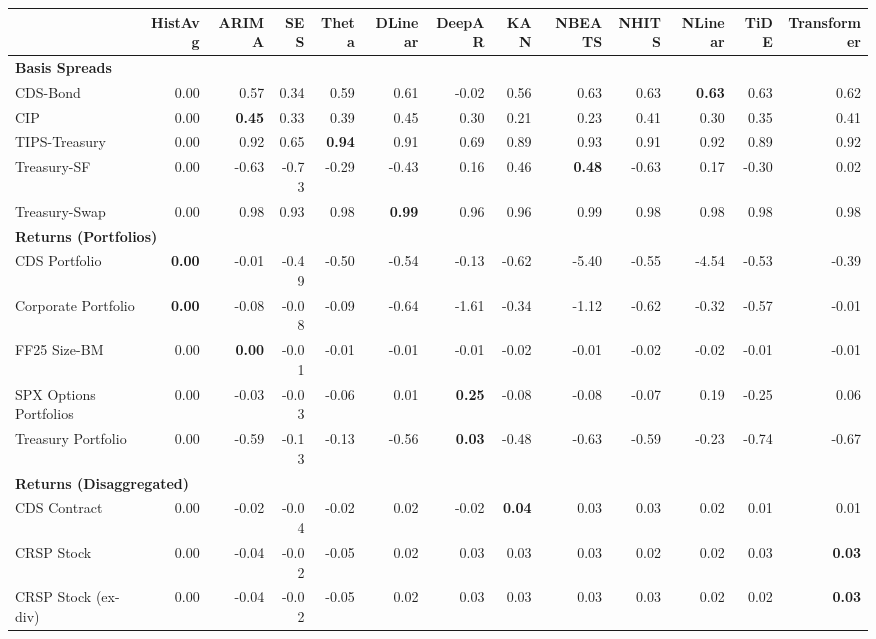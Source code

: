 \scriptsize
\setlength{\tabcolsep}{1.5pt}
\renewcommand{\arraystretch}{0.9}
\begin{tabular}{@{}lrrrrrrrrrrrr@{}}
\toprule
 & HistAvg & ARIMA & SES & Theta & DLinear & DeepAR & KAN & NBEATS & NHITS & NLinear & TiDE & Transformer \\
\midrule
\multicolumn{13}{l}{\textbf{Basis Spreads}} \\
CDS-Bond & 0.00 & 0.57 & 0.34 & 0.59 & 0.61 & -0.02 & 0.56 & 0.63 & 0.63 & \textbf{0.63} & 0.63 & 0.62 \\
CIP & 0.00 & \textbf{0.45} & 0.33 & 0.39 & 0.45 & 0.30 & 0.21 & 0.23 & 0.41 & 0.30 & 0.35 & 0.41 \\
TIPS-Treasury & 0.00 & 0.92 & 0.65 & \textbf{0.94} & 0.91 & 0.69 & 0.89 & 0.93 & 0.91 & 0.92 & 0.89 & 0.92 \\
Treasury-SF & 0.00 & -0.63 & -0.73 & -0.29 & -0.43 & 0.16 & 0.46 & \textbf{0.48} & -0.63 & 0.17 & -0.30 & 0.02 \\
Treasury-Swap & 0.00 & 0.98 & 0.93 & 0.98 & \textbf{0.99} & 0.96 & 0.96 & 0.99 & 0.98 & 0.98 & 0.98 & 0.98 \\
\midrule
\multicolumn{13}{l}{\textbf{Returns (Portfolios)}} \\
CDS Portfolio & \textbf{0.00} & -0.01 & -0.49 & -0.50 & -0.54 & -0.13 & -0.62 & -5.40 & -0.55 & -4.54 & -0.53 & -0.39 \\
Corporate Portfolio & \textbf{0.00} & -0.08 & -0.08 & -0.09 & -0.64 & -1.61 & -0.34 & -1.12 & -0.62 & -0.32 & -0.57 & -0.01 \\
FF25 Size-BM & 0.00 & \textbf{0.00} & -0.01 & -0.01 & -0.01 & -0.01 & -0.02 & -0.01 & -0.02 & -0.02 & -0.01 & -0.01 \\
SPX Options Portfolios & 0.00 & -0.03 & -0.03 & -0.06 & 0.01 & \textbf{0.25} & -0.08 & -0.08 & -0.07 & 0.19 & -0.25 & 0.06 \\
Treasury Portfolio & 0.00 & -0.59 & -0.13 & -0.13 & -0.56 & \textbf{0.03} & -0.48 & -0.63 & -0.59 & -0.23 & -0.74 & -0.67 \\
\midrule
\multicolumn{13}{l}{\textbf{Returns (Disaggregated)}} \\
CDS Contract & 0.00 & -0.02 & -0.04 & -0.02 & 0.02 & -0.02 & \textbf{0.04} & 0.03 & 0.03 & 0.02 & 0.01 & 0.01 \\
CRSP Stock & 0.00 & -0.04 & -0.02 & -0.05 & 0.02 & 0.03 & 0.03 & 0.03 & 0.02 & 0.02 & 0.03 & \textbf{0.03} \\
CRSP Stock (ex-div) & 0.00 & -0.04 & -0.02 & -0.05 & 0.02 & 0.03 & 0.03 & 0.03 & 0.03 & 0.02 & 0.02 & \textbf{0.03} \\

\end{tabular}
